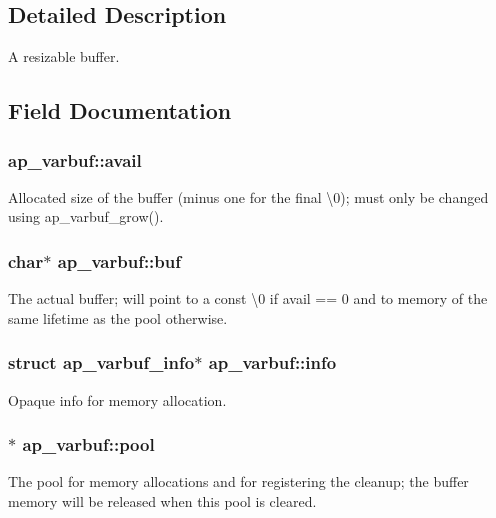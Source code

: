 \subsection{Detailed Description}
A resizable buffer. 

\subsection{Field Documentation}
\subsubsection[{\texorpdfstring{avail}{avail}}]{ ap\+\_\+varbuf\+::avail}\hypertarget{structap__varbuf_a2a13c995fb5f9c15c677ff03df0f1ceb}{}\label{structap__varbuf_a2a13c995fb5f9c15c677ff03df0f1ceb}
Allocated size of the buffer (minus one for the final \textbackslash{}0); must only be changed using ap\+\_\+varbuf\+\_\+grow(). 
\subsubsection[{\texorpdfstring{buf}{buf}}]{\setlength{\rightskip}{0pt plus 5cm}char$\ast$ ap\+\_\+varbuf\+::buf}\hypertarget{structap__varbuf_a7877daf6c339eac8308a117fe0fcc112}{}\label{structap__varbuf_a7877daf6c339eac8308a117fe0fcc112}
The actual buffer; will point to a const \textquotesingle{}\textbackslash{}0\textquotesingle{} if avail == 0 and to memory of the same lifetime as the pool otherwise. 
\subsubsection[{\texorpdfstring{info}{info}}]{\setlength{\rightskip}{0pt plus 5cm}struct {\bf ap\+\_\+varbuf\+\_\+info}$\ast$ ap\+\_\+varbuf\+::info}\hypertarget{structap__varbuf_ae5363fe8061898625080f8a4558890c5}{}\label{structap__varbuf_ae5363fe8061898625080f8a4558890c5}
Opaque info for memory allocation. 
\subsubsection[{\texorpdfstring{pool}{pool}}]{$\ast$ ap\+\_\+varbuf\+::pool}\hypertarget{structap__varbuf_a194c9dfb9bd169672dc081d655b4626f}{}\label{structap__varbuf_a194c9dfb9bd169672dc081d655b4626f}
The pool for memory allocations and for registering the cleanup; the buffer memory will be released when this pool is cleared. 
